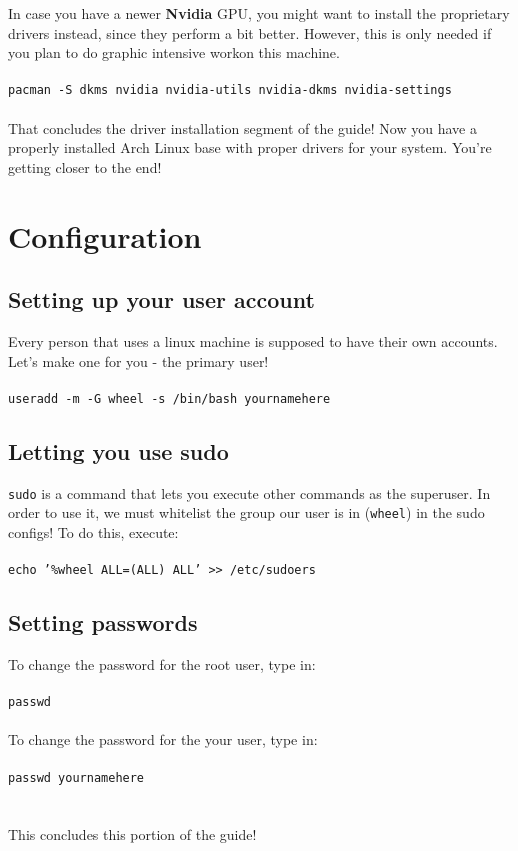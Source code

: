 \documentclass{article}
\begin{document}
In case you have a newer \textbf{Nvidia} GPU, you might want to install the proprietary drivers instead, since they perform a bit better. However, this is only needed if you plan to do graphic intensive workon this machine.
\\\\
\texttt{pacman -S dkms nvidia nvidia-utils nvidia-dkms nvidia-settings}
\\\\
That concludes the driver installation segment of the guide!
Now you have a properly installed Arch Linux base with proper drivers for your system. You're getting closer to the end! 

\section{Configuration}
\subsection{Setting up your user account}
Every person that uses a linux machine is supposed to have their own accounts. Let's make one for you - the primary user!
\\\\
\texttt{useradd -m -G wheel -s /bin/bash yournamehere}

\subsection{Letting you use sudo}
\texttt{sudo} is a command that lets you execute other commands as the superuser. In order to use it, we must whitelist the group our user is in (\texttt{wheel}) in the sudo configs! To do this, execute: 
\\\\
\texttt{echo '\%wheel ALL=(ALL) ALL' >> /etc/sudoers}

\subsection{Setting passwords}
To change the password for the root user, type in:
\\\\\texttt{passwd}\\\\
To change the password for the your user, type in:
\\\\\texttt{passwd yournamehere}\\\\
\\This concludes this portion of the guide!
\end{document}

